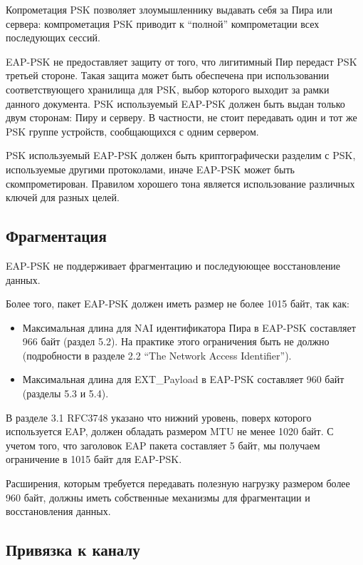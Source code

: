 Копрометация PSK позволяет злоумышленнику выдавать себя за Пира или сервера: компрометация PSK приводит к ``полной'' компрометации всех последующих сессий.

EAP-PSK не предоставляет защиту от того, что лигитимный Пир передаст PSK третьей стороне. Такая защита может быть обеспечена при использовании соответствующего хранилища для PSK, выбор которого выходит за рамки данного документа. PSK используемый EAP-PSK должен быть выдан только двум сторонам: Пиру и серверу. В частности, не стоит передавать один и тот же PSK группе устройств, сообщающихся с одним сервером.

PSK используемый EAP-PSK должен быть криптографически разделим с PSK, используемые другими протоколами, иначе EAP-PSK может быть скомпрометирован. Правилом хорошего тона является использование различных ключей для разных целей.

\subsection{Фрагментация}

EAP-PSK не поддерживает фрагментацию и последуюющее восстановление данных.

Более того, пакет EAP-PSK должен иметь размер не более 1015 байт, так как:

\begin{itemize}
\item Максимальная длина для NAI идентификатора Пира в EAP-PSK составляет 966 байт (раздел 5.2). На практике этого ограничения быть не должно (подробности в разделе 2.2 ``The Network Access Identifier'').
\item Максимальная длина для EXT\_Payload в EAP-PSK составляет 960 байт (разделы 5.3 и 5.4).
\end{itemize}

В разделе 3.1 RFC3748 указано что нижний уровень, поверх которого используется EAP, должен обладать размером MTU не менее 1020 байт. С учетом того, что заголовок EAP пакета составляет 5 байт, мы получаем ограничение в 1015 байт для EAP-PSK.

Расширения, которым требуется передавать полезную нагрузку размером более 960 байт, должны иметь собственные механизмы для фрагментации и восстановления данных.

\subsection{Привязка к каналу}

